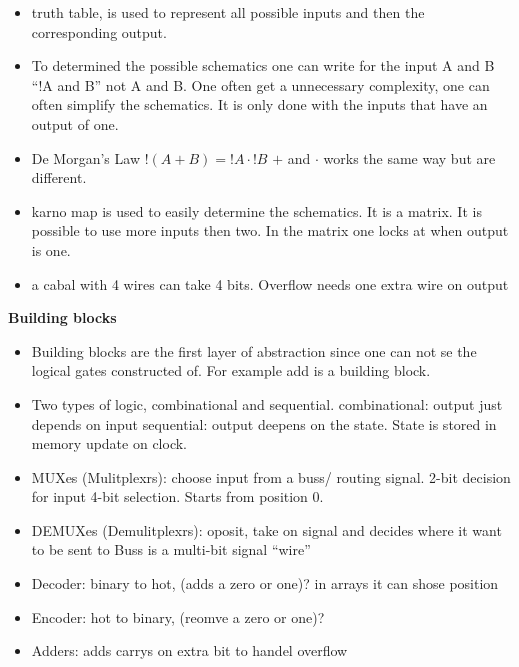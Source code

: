 \begin{itemize}
\item  truth table, is used to represent all possible inputs and then the corresponding output.
\item  To determined the possible schematics one can write for the input A and B ``!A and B''
  not A and B. One often get a unnecessary complexity, one can often simplify the schematics.
  It is only done with the inputs that have an output of one.
\item  De Morgan’s Law $!(A+B)=!A \cdot !B$ $+$ and $\cdot$ works the same way but are different.
\item  karno map is used to easily determine the schematics. It is a matrix. It is possible to use
  more inputs then two. In the matrix one locks at when output is one.
\item  a cabal with 4 wires can take 4 bits. Overflow needs one extra wire on output
\end{itemize}


\textbf{Building blocks}
\begin{itemize}
\item   Building blocks are the first layer of abstraction since one can not se the logical gates
  constructed of. For example add is a building block.
\item  Two types of logic, combinational and sequential.
  combinational: output just depends on input
  sequential: output deepens on the state. State is stored in memory update on clock.
\end{itemize}

\begin{itemize}
\item  MUXes (Mulitplexrs): choose input from a buss/ routing signal.
  2-bit decision for input 4-bit selection. Starts from position 0.
\item  DEMUXes (Demulitplexrs): oposit, take on signal and decides where it want to be sent to
  Buss is a multi-bit signal ``wire''
\item  Decoder: binary to hot, (adds a zero or one)? in arrays it can shose position
\item  Encoder: hot to binary, (reomve a zero or one)?
\item  Adders: adds carrys on extra bit to handel overflow
\end{itemize}

